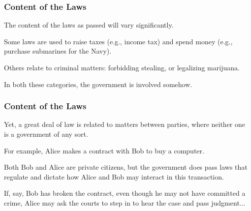 \begin{frame}
\frametitle{Content of the Laws}

The content of the laws as passed will vary significantly.

Some laws are used to raise taxes (e.g., income tax) and spend money (e.g., purchase submarines for the Navy).

Others relate to criminal matters: forbidding stealing, or legalizing marijuana.

In both these categories, the government is involved somehow. 

\end{frame}



\begin{frame}
\frametitle{Content of the Laws}

Yet, a great deal of law is related to matters between parties, where neither one is a government of any sort.

For example, Alice makes a contract with Bob to buy a computer. 

Both Bob and Alice are private citizens, but the government does pass laws that regulate and dictate how Alice and Bob may interact in this transaction.

If, say, Bob has broken the contract, even though he may not have committed a crime, Alice may ask the courts to step in to hear the case and pass judgment...


\end{frame}





